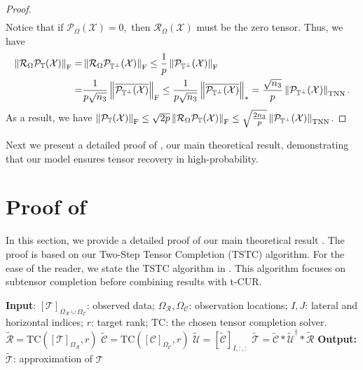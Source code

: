 \documentclass[twoside,12pt]{article}
\newcommand{\TNN}{\textnormal{TNN}}
\def\fro{{\mathrm{F}}}
\def\T{\mathcal{T}}
\def\fro{{\mathrm{F}}}
\def\T{\mathcal{T}}
\begin{document}
\begin{proof}
\begin{align*}
\end{align*}
Notice that if $\mathcal{P}_{\Omega}(\mathcal{X})=0,$ then $\mathcal{R}_{\Omega}(\mathcal{X})$ must be the zero tensor. Thus, we have
\begin{align*}
    \left\|\mathcal{R}_{\Omega}\mathcal{P}_{\mathbb{T}}(\mathcal{X})\right\|_{\fro} = &\left\|\mathcal{R}_{\Omega}\mathcal{P}_{\mathbb{T}^{\perp}}(\mathcal{X})\right\|_{\fro} 
    \leq \frac{1}{p}\left\|\mathcal{P}_{\mathbb{T}^{\perp}}(\mathcal{X})\right\|_{\fro}\\
    =& \frac{1}{p\sqrt{n_3}}\left\|\overline{\mathcal{P}_{\mathbb{T}^{\perp}}(\mathcal{X})}\right\|_{\fro} \leq \frac{1}{p\sqrt{n_3}}\left\|\overline{\mathcal{P}_{\mathbb{T}^{\perp}}(\mathcal{X})}\right\|_{*} = \frac{\sqrt{n_3}}{p}\left\|\mathcal{P}_{\mathbb{T}^{\perp}}(\mathcal{X})\right\|_{\TNN}.
    \end{align*}
    As a result, we have $\left\|\mathcal{P}_{\mathbb{T}}(\mathcal{X})\right\|_{\fro}\leq \sqrt{2p}\left\|\mathcal{R}_{\Omega}\mathcal{P}_{\mathbb{T}}(\mathcal{X})\right\|_{\fro} \leq \sqrt{\frac{2n_3}{p}}\left\|\mathcal{P}_{\mathbb{T}^{\perp}}(\mathcal{X})\right\|_{\TNN}$.
\end{proof}

Next we present a detailed proof of , our main theoretical result, demonstrating that our model ensures  tensor recovery in high-probability.  
\section{Proof of }
In this section, we provide a detailed proof of our main theoretical result . The proof is based on  our Two-Step Tensor Completion (TSTC) algorithm. For the ease of the reader, we state the TSTC algorithm in . This algorithm focuses on subtensor completion before combining results with t-CUR. 
 \begin{algorithm}[!ht]
 \caption{Two-Step Tensor Completion (TSTC)}\label{alg:Twostep}
\begin{algorithmic}[1]
\State\textbf{Input}: 
$[\T]_{\Omega_{\mathcal{R}}\cup\Omega_{\mathcal{C}}}$: observed data; 
$\Omega_{\mathcal{R}}, \Omega_{\mathcal{C}}$: observation locations; 
$I,J$: lateral and horizontal indices;  
$r$: target rank;
  $\mathrm{TC}$: the chosen tensor completion solver. 
\State $\widetilde{\mathcal{R}} = \mathrm{TC}([\T]_{\Omega_{\mathcal{R}}},r) $ 
\State $\widetilde{\mathcal{C}} = \mathrm{TC}([\mathcal{C}]_{\Omega_{\mathcal{C}}},r) $ 
\State $\widetilde{\mathcal{U}} = [\widetilde{\mathcal{C}}]_{I,:,:} $
\State $\widetilde{\T} = \widetilde{\mathcal{C}}*{\widetilde{\mathcal{U}}}^\dagger *\widetilde{\mathcal{R}}$
\State\textbf{Output: }$\widetilde{\mathcal{T}}$: approximation of $\mathcal{T}$
\end{algorithmic}
\end{algorithm} 
\end{document}
